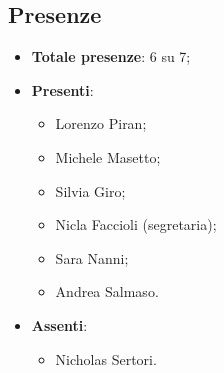 \documentclass[11pt]{article}
\begin{document}
	\subsection{Presenze}
	\begin{itemize}
		\item \textbf{Totale presenze}: 6 su 7;
		\item \textbf{Presenti}:
		\begin{itemize}
			\item Lorenzo Piran; 
			\item Michele Masetto;
			\item Silvia Giro;
			\item Nicla Faccioli (segretaria);
			\item Sara Nanni;
			\item Andrea Salmaso.
			
		\end{itemize}
		\item \textbf{Assenti}:
			\begin{itemize}
				\item Nicholas Sertori.
			\end{itemize}
	\end{itemize}
	
	\newpage
	
\end{document}
